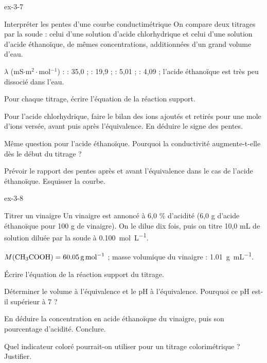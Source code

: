 \begin{blocLivre}{ex-3-7}
\begin{exercice}[2]{Interpréter les pentes d'une courbe conductimétrique}
On compare deux titrages par la soude : celui d'une solution d'acide chlorhydrique et celui d'une solution d'acide
éthanoïque, de mêmes concentrations, additionnées d'un grand volume d'eau.
\begin{donnees}
$\lambda$ (mS$\cdot$m$^2\cdot$mol$^{-1}$) :  : 35,0 ;  : 19,9 ;  : 5,01 ;  : 4,09 ;
l'acide éthanoïque est très peu dissocié dans l'eau.
\end{donnees}
\begin{questions}
\item Pour chaque titrage, écrire l'équation de la réaction support.
\item Pour l'acide chlorhydrique, faire le bilan des ions ajoutés et retirés pour une mole d'ions  versée,
avant puis après l'équivalence. En déduire le signe des pentes.
\item Même question pour l'acide éthanoïque. Pourquoi la conductivité augmente-t-elle dès le début du titrage ?
\item Prévoir le rapport des pentes après et avant l'équivalence dans le cas de l'acide éthanoïque. Esquisser la courbe.
\end{questions}
\end{exercice}
\end{blocLivre}
\begin{blocLivre}{ex-3-8}
\begin{exercice}[2]{Titrer un vinaigre}
Un vinaigre est annoncé à 6,0 \% d'acidité (6,0 g d'acide éthanoïque pour 100 g de vinaigre). On le dilue dix fois,
puis on titre 10,0 mL de solution diluée par la soude à \qty{0,100}{mol.L^{-1}}.
\begin{donnees}
$M(\ce{CH3COOH})=\qty{60,05}{g.mol^{-1}}$ ; masse volumique du vinaigre : \qty{1,01}{g.mL^{-1}}.
\end{donnees}
\begin{questions}
\item Écrire l'équation de la réaction support du titrage.
\item Déterminer le volume à l'équivalence et le pH à l'équivalence. Pourquoi ce pH est-il supérieur à 7 ?
\item En déduire la concentration en acide éthanoïque du vinaigre, puis son pourcentage d'acidité. Conclure.
\item Quel indicateur coloré pourrait-on utiliser pour un titrage colorimétrique ? Justifier.
\end{questions}
\end{exercice}
\end{blocLivre}
